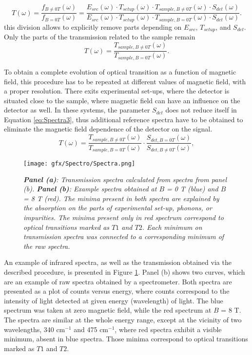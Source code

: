 \documentclass[titlepage,a4paper]{book}
\begin{document}
\begin{equation}
\label{eq:Spectra3}
T(\omega) = \frac{f_{B\neq 0T}(\omega)}{f_{B=0T}(\omega)} = \frac{E_{src}(\omega)\cdot T_{setup}(\omega)\cdot T_{sample,B\neq 0T}(\omega)\cdot S_{det}(\omega)}{E_{src}(\omega)\cdot T_{setup}(\omega)\cdot T_{sample,B=0T}(\omega)\cdot S_{det}(\omega)}.
\end{equation}
this division allows to explicitly remove parts depending on $E_{src}$, $T_{setup}$, and $S_{det}$. Only the parts of the transmission related to the sample remain
\begin{equation}
\label{eq:Spectra4}
T(\omega) = \frac{T_{sample,B\neq 0T}(\omega)}{ T_{sample,B=0T}(\omega)}.
\end{equation}

To obtain a complete evolution of optical transition as a function of magnetic field, this procedure has to be repeated at different values of magnetic field, with a proper resolution. There exits experimental set-ups, where the detector is situated close to the sample, where magnetic field can have an influence on the detector as well. In these systems, the parameter $S_{det}$ does not reduce itself in Equation \ref{eq:Spectra3}, thus additional reference spectra have to be obtained to eliminate the magnetic field dependence of the detector on the signal.
\begin{equation}
\label{eq:Spectra5}
T(\omega) = \frac{T_{sample,B\neq 0T}(\omega)}{ T_{sample,B=0T}(\omega)}\cdot \frac{S_{det,B = 0T}(\omega)}{ S_{det,B\neq 0T}(\omega)},
\end{equation}

\begin{figure}[ht]
	\centering
	\texttt{[image: gfx/Spectro/Spectra.png]}
	\vspace{-10pt}
	\caption{\textit{\textbf{Panel (a)}: Transmission spectra calculated from spectra from panel (b). \textbf{Panel (b)}: Example spectra obtained at $B$ = 0 T (blue) and $B$ = 8 T (red). The minima present in both spectra are explained by the absorption on the parts of experimental set-up, phonons, or impurities. The minima present only in red spectrum correspond to optical transitions marked as $T1$ and $T2$. Each minimum on transmission spectra was connected to a corresponding minimum of the raw spectra.}}
	\label{fig:Spectra}
\end{figure} 

An example of infrared spectra, as well as the transmission obtained via the described procedure, is presented in Figure \ref{fig:Spectra}. Panel (b) shows two curves, which are an example of raw spectra obtained by a spectrometer. Both spectra are presented as a plot of counts versus energy, where counts correspond to the intensity of light detected at given energy (wavelength) of light. The blue spectrum was taken at zero magnetic field, while the red spectrum at $B$ = 8 T. The spectra are similar at the whole energy range, except at the vicinity of two wavelengths, 340 cm$^{-1}$ and 475 cm$^{-1}$, where red spectra exhibit a visible minimum, absent in blue spectra. Those minima correspond to optical transitions marked as $T1$ and $T2$.
\end{document}
